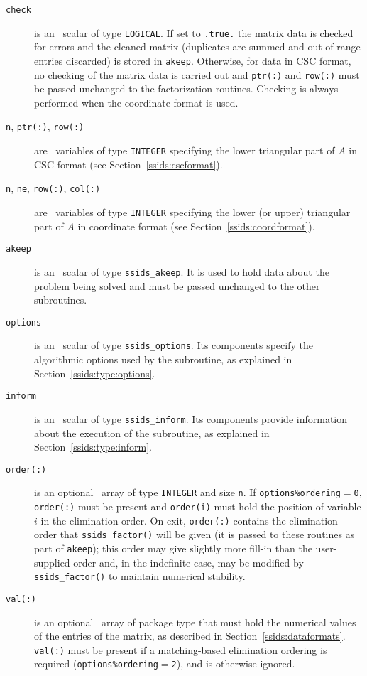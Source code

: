 \noindent
\begin{description}

\item[\texttt{check}] is an \intentin\ scalar of
type  {\tt LOGICAL}. If set to {\tt .true.} the matrix
data is checked for errors and the cleaned matrix
(duplicates are summed and out-of-range entries
discarded) is stored in {\tt akeep}.
Otherwise, for data in CSC format, no checking of the matrix data is carried out
and {\tt ptr(:)} and {\tt row(:)} must be passed unchanged to the factorization routines. 
Checking is always performed when the coordinate format is used.

\item[\texttt{n}{\rm ,} \texttt{ptr(:)}{\rm ,} \texttt{row(:)}] are \intentin\ 
   variables of type {\tt INTEGER} specifying the lower triangular part of $A$
   in CSC format (see Section~\ref{ssids:cscformat}).

\item[\texttt{n}{\rm ,} \texttt{ne}{\rm ,} \texttt{row(:)}{\rm ,} \texttt{col(:)}]
   are \intentin\ variables of type {\tt INTEGER} specifying the lower
   (or upper) triangular part of $A$ in coordinate format (see Section~\ref{ssids:coordformat}).

\item[\texttt{akeep}] is an \intentout\ scalar of type
{\tt ssids\_akeep}. It is used to hold data about the problem being
solved and must be passed unchanged to the other subroutines.

\item[\texttt{options}] is an \intentin\ scalar of type {\tt ssids\_options}.
Its components specify the algorithmic options used by the subroutine, as
explained in Section~\ref{ssids:type:options}.

\item[\texttt{inform}] is an \intentout\ scalar of type
{\tt ssids\_inform}. Its components provide information about the execution
of the subroutine, as explained in Section~\ref{ssids:type:inform}.

\item[\texttt{order(:)}] is an optional \intentinout\ array of type
{\tt INTEGER} and size {\tt n}. If {\tt options\%ordering}$=${\tt 0},
{\tt order(:)} must be present and {\tt order(i)} must hold the  position of
variable $i$  in the elimination order. On exit, {\tt order(:)} contains the
elimination order that {\tt ssids\_factor()} will be given (it is passed to these
routines as part of {\tt akeep}); this order may give slightly more fill-in
than the user-supplied order and, in the indefinite case, may be modified by
{\tt ssids\_factor()} to maintain numerical stability. 

\item[\texttt{val(:)}] is an optional \intentin\ array of package type that must
hold the numerical values of the entries of the matrix, as described in
Section~\ref{ssids:dataformats}.
{\tt val(:)} must be present if a matching-based elimination ordering is
required ({\tt options\%ordering$=$2}), and is otherwise ignored.

\end{description}


